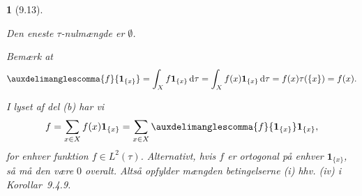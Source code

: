 \documentclass[a4paper, 11pt, article, danish, oneside]{memoir}
\title{\doctitle}
\author{\docauthor}
\newcommand{\blank}{\mathrel{\;\cdot\;}}
\newcommand{\blankifempty}[1]{\ifstrempty{#1}{\blank}{#1}}
\newcommand{\inner}[2]{\auxdelimanglescomma{\blankifempty{#1}}{\blankifempty{#2}}}
\newcommand{\dif}{\mathop{}\!\mathrm{d}}
\newcommand{\indicator}[1]{\mathbf{1}_{#1}}
\newcommand{\pencilsymbol}{\raisebox{-2pt}{\normalfont\PencilLeft}}
\theoremstyle{changedotcustomnumber}
\theoremstyle{changedotbreakcustomnumber}
\newtheorem{opgavebreak}{\pencilsymbol}
\begin{document}
\maketitle


\begin{opgavebreak}[9.13]
\begin{solutionsec}
    \item Den eneste $\tau$-nulmængde er $\emptyset$.

    \item Bemærk at
    \begin{equation*}
        \inner{f}{\indicator{\{x\}}}
            = \int_X f \indicator{\{x\}} \dif\tau
            = \int_X f(x) \indicator{\{x\}} \dif\tau
            = f(x) \tau(\{x\})
            = f(x).
    \end{equation*}

    \item I lyset af del (b) har vi
    \begin{equation*}
        f
            = \sum_{x \in X} f(x) \indicator{\{x\}}
            = \sum_{x \in X} \inner{f}{\indicator{\{x\}}} \indicator{\{x\}},
    \end{equation*}
    for enhver funktion $f \in L^2(\tau)$. Alternativt, hvis $f$ er ortogonal på enhver $\indicator{\{x\}}$, så må den være $0$ overalt. Altså opfylder mængden betingelserne (i) hhv. (iv) i Korollar~9.4.9.
\end{solutionsec}
\end{opgavebreak}
\end{document}
